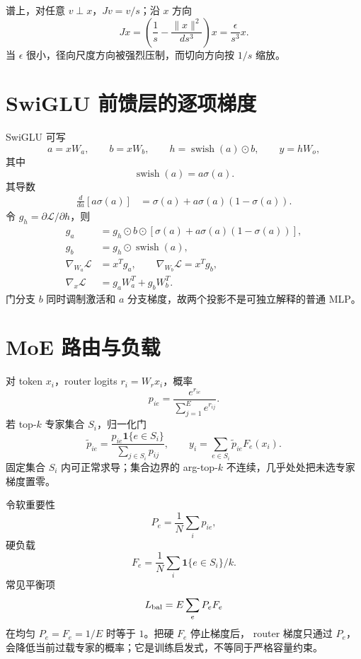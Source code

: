 \documentclass[11pt]{article}
\numberwithin{equation}{section}
\newcommand{\1}{\mathbf{1}}
\newcommand{\cL}{\mathcal{L}}
\begin{document}
谱上，对任意 $v\perp x$，$Jv=v/s$；沿 $x$ 方向
\begin{equation}
 Jx=\left(\frac1s-\frac{\|x\|^2}{d s^3}\right)x
 =\frac{\epsilon}{s^3}x.
\end{equation}
当 $\epsilon$ 很小，径向尺度方向被强烈压制，而切向方向按 $1/s$ 缩放。

\section{SwiGLU 前馈层的逐项梯度}

SwiGLU 可写
\begin{equation}
 a=xW_a,\qquad b=xW_b,\qquad
 h=\operatorname{swish}(a)\odot b,\qquad
 y=hW_o,
\end{equation}
其中
\begin{equation}
 \operatorname{swish}(a)=a\sigma(a).
\end{equation}
其导数
\begin{align}
 \frac d{da}[a\sigma(a)]
 &=\sigma(a)+a\sigma(a)(1-\sigma(a)).
\end{align}
令 $g_h=\partial\cL/\partial h$，则
\begin{align}
 g_a&=g_h\odot b\odot
 [\sigma(a)+a\sigma(a)(1-\sigma(a))],\\
 g_b&=g_h\odot\operatorname{swish}(a),\\
 \nabla_{W_a}\cL&=x^Tg_a,\qquad
 \nabla_{W_b}\cL=x^Tg_b,\\
 \nabla_x\cL&=g_aW_a^T+g_bW_b^T.
\end{align}
门分支 $b$ 同时调制激活和 $a$ 分支梯度，故两个投影不是可独立解释的普通 MLP。

\section{MoE 路由与负载}

对 token $x_i$，router logits $r_i=W_rx_i$，概率
\begin{equation}
 p_{ie}=\frac{e^{r_{ie}}}{\sum_{j=1}^{E}e^{r_{ij}}}.
\end{equation}
若 top-$k$ 专家集合 $S_i$，归一化门
\begin{equation}
 \widetilde p_{ie}=\frac{p_{ie}\1\{e\in S_i\}}
 {\sum_{j\in S_i}p_{ij}},
 \qquad
 y_i=\sum_{e\in S_i}\widetilde p_{ie}F_e(x_i).
\end{equation}
固定集合 $S_i$ 内可正常求导；集合边界的 arg-top-$k$ 不连续，几乎处处把未选专家梯度置零。

令软重要性
\begin{equation}
 P_e=\frac1N\sum_ip_{ie},
\end{equation}
硬负载
\begin{equation}
 F_e=\frac1N\sum_i\1\{e\in S_i\}/k.
\end{equation}
常见平衡项
\begin{equation}
 L_{\rm bal}=E\sum_eP_eF_e
\end{equation}
在均匀 $P_e=F_e=1/E$ 时等于 $1$。把硬 $F_e$ 停止梯度后，
router 梯度只通过 $P_e$，会降低当前过载专家的概率；它是训练启发式，不等同于严格容量约束。
\end{document}
